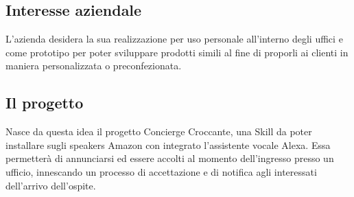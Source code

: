 \subsection{Interesse aziendale}
L'azienda desidera la sua realizzazione per uso personale all'interno degli uffici e come prototipo per poter sviluppare prodotti simili al fine di proporli ai clienti in maniera personalizzata o preconfezionata.

\subsection{Il progetto}
Nasce da questa idea il progetto Concierge Croccante, una Skill da poter installare sugli speakers Amazon con integrato l'assistente vocale Alexa. Essa permetterà di annunciarsi ed essere accolti al momento dell'ingresso presso un ufficio, innescando un processo di accettazione e di notifica agli interessati dell'arrivo dell'ospite.

